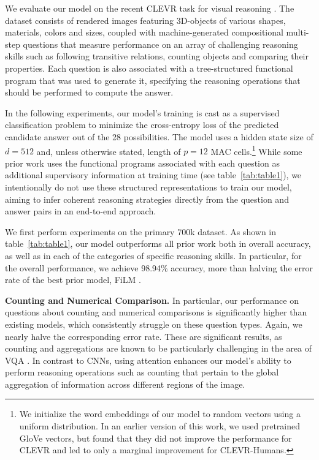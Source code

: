 \documentclass[fleqn]{article}
\newcommand{\tabref}[1]{table~\ref{tab:#1}}
\begin{document}
We evaluate our model on the recent CLEVR task for visual reasoning \citep{clevr}. The dataset consists of rendered images featuring 3D-objects of various shapes, materials, colors and sizes, coupled with machine-generated compositional multi-step questions that measure performance on an array of challenging reasoning skills such as following transitive relations, counting objects and comparing their properties. Each question is also associated with a tree-structured functional program that was used to generate it, specifying the reasoning operations that should be performed to compute the answer. 



In the following experiments, our model's training is cast as a supervised classification problem to minimize the cross-entropy loss of the predicted candidate answer out of the 28 possibilities. The model uses a hidden state size of \(d=512\) and, unless otherwise stated, length of \(p=12\) MAC cells.\footnote{We initialize the word embeddings of our model to random vectors using a uniform distribution. In an earlier version of this work, we used pretrained GloVe vectors, but found that they did not improve the performance for CLEVR and led to only a marginal improvement for CLEVR-Humans.} While some prior work uses the functional programs associated with each question as additional supervisory information at training time (see \tabref{table1}), we intentionally do not use these structured representations to train our model, aiming to infer coherent reasoning strategies directly from the question and answer pairs in an end-to-end approach.

We first perform experiments on the primary 700k dataset. As shown in \tabref{table1}, our model outperforms all prior work both in overall accuracy, as well as in each of the categories of specific reasoning skills. In particular, for the overall performance, we achieve 98.94\% accuracy, more than halving the error rate of the best prior model, FiLM \citep{film}.

\textbf{Counting and Numerical Comparison.} In particular, our performance on questions about counting and numerical comparisons is significantly higher than existing models, which consistently struggle on these question types. Again, we nearly halve the corresponding error rate. These are significant results, as counting and aggregations are known to be particularly challenging in the area of VQA \citep{counting}. In contrast to CNNs, using attention enhances our model's ability to perform reasoning operations such as counting that pertain to the global aggregation of information across different regions of the image. 
\end{document}
